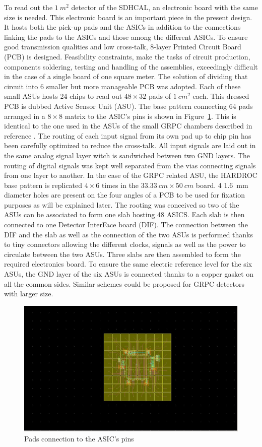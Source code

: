 To read out the $\SI{1}{m^2}$ detector of the SDHCAL, an electronic board with the
same size is needed. This electronic board is an important piece in the present
design. It hosts both the pick-up pads and the ASICs in addition to the
connections linking the pads to the ASICs and those among the different ASICs.
To ensure good transmission qualities and low cross-talk, 8-layer Printed
Circuit Board (PCB) is designed. Feasibility constraints, make the tasks of
circuit production, components soldering, testing and handling of the
assemblies, exceedingly difficult in the case of a single board of one square
meter. The solution of dividing that circuit into 6 smaller but more
manageable PCB was adopted. Each of these small ASUs hosts 24 chips to read out
$48\times 32$ pads of $\SI{1}{cm^2}$ each. This dressed PCB is dubbed Active Sensor
Unit (ASU). The base pattern connecting 64 pads arranged in a $8\times 8$ matrix
to the ASIC's pins is shown in Figure~\ref{fig:Calorimeter:SDHCAL_GRPC:asicPins}. This is identical to the
one used in the ASUs of the small GRPC chambers described in reference
\cite{1748-0221-6-02-P02001}. The routing of each input signal from its own pad up to chip pin
has been carefully optimized to reduce the cross-talk. All input signals are
laid out in the same analog signal layer witch is sandwiched between two GND
layers. The routing of digital signals was kept well separated from the vias
connecting signals from one layer to another. In the case of the GRPC related
ASU, the HARDROC base pattern is replicated $4\times 6$ times in the $\SI{33.33}{cm}
\times \SI{50}{cm}$ board. 4 \SI{1.6}{mm} diameter holes are present on the four
angles of a PCB to be used for fixation purposes as will be explained later.
The rooting was conceived so two of the ASUs can be associated to form one slab
hosting 48 ASICS. Each slab is then connected to one Detector InterFace board
(DIF). The connection between the DIF and the slab as well as the connection
of the two ASUs is performed thanks to tiny connectors allowing the
different clocks, signals as well as the power to circulate between the two
ASUs. Three slabs are then assembled to form the required electronics board.
To ensure the same electric reference level for the six ASUs, the GND layer of
the six ASUs is connected thanks to a copper gasket on all the common sides.
Similar schemes could be proposed for GRPC detectors with larger size.


\begin{figure}
\centering
\includegraphics[width=.7\columnwidth]{Calorimeter/SDHCAL_GRPC/figures/HR2_base.jpg}
\caption{Pads connection to the ASIC's pins}
\label{fig:Calorimeter:SDHCAL_GRPC:asicPins}
\end{figure}


